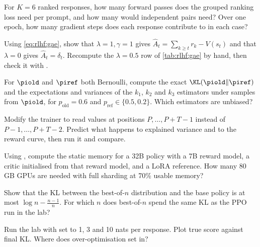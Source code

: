 \begin{exercise}
For $K=6$ ranked responses, how many forward passes does the grouped ranking loss need per prompt, and how
many would independent pairs need? Over one epoch, how many gradient steps does each response contribute
to in each case?
\end{exercise}

\begin{exercise}
Using \cref{eq:rlhf:gae}, show that $\lambda=1,\gamma=1$ gives $\hat A_t=\sum_{k\ge t}r_k-V(s_t)$ and that
$\lambda=0$ gives $\hat A_t=\delta_t$. Recompute the $\lambda=0.5$ row of \cref{tab:rlhf:gae} by hand,
then check it with .
\end{exercise}

\begin{exercise}[KL estimators]
For $\piold$ and $\piref$ both Bernoulli, compute the exact $\KL(\piold\|\piref)$ and the expectations and
variances of the $k_1$, $k_2$ and $k_3$ estimators under samples from $\piold$, for
$p_{\text{old}}=0.6$ and $p_{\text{ref}}\in\{0.5,0.2\}$. Which estimators are unbiased?
\end{exercise}

\begin{exercise}
Modify the trainer to read values at positions $P,\dots,P+T-1$ instead of $P-1,\dots,P+T-2$. Predict
what happens to explained variance and to the reward curve, then run it and compare.
\end{exercise}

\begin{exercise}
Using , compute the static memory for a 32B policy with a 7B reward model, a
critic initialised from that reward model, and a LoRA reference. How many 80\,GB GPUs are needed with full
sharding at 70\% usable memory?
\end{exercise}

\begin{exercise}[Best-of-$n$ KL]
Show that the KL between the best-of-$n$ distribution and the base policy is at most $\log n-\frac{n-1}{n}$.
For which $n$ does best-of-$n$ spend the same KL as the PPO run in the lab?
\end{exercise}

\begin{exercise}[Adaptive KL]
Run the lab with  set to 1, 3 and 10 nats per response. Plot true score against final
KL. Where does over-optimisation set in?
\end{exercise}

